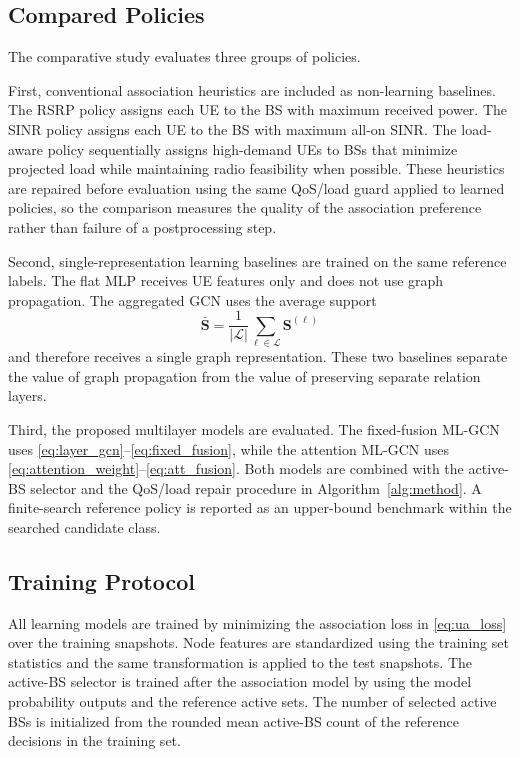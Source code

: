 \documentclass[journal]{IEEEtran}
\begin{document}
\subsection{Compared Policies}
The comparative study evaluates three groups of policies.

First, conventional association heuristics are included as non-learning
baselines. The RSRP policy assigns each UE to the BS with maximum received
power. The SINR policy assigns each UE to the BS with maximum all-on SINR. The
load-aware policy sequentially assigns high-demand UEs to BSs that minimize
projected load while maintaining radio feasibility when possible. These
heuristics are repaired before evaluation using the same QoS/load guard applied
to learned policies, so the comparison measures the quality of the association
preference rather than failure of a postprocessing step.

Second, single-representation learning baselines are trained on the same
reference labels. The flat MLP receives UE features only and does not use graph
propagation. The aggregated GCN uses the average support
\begin{equation}
    \bar{\mathbf{S}}=\frac{1}{|\mathcal{L}|}
    \sum_{\ell\in\mathcal{L}}\mathbf{S}^{(\ell)}
\end{equation}
and therefore receives a single graph representation. These two baselines
separate the value of graph propagation from the value of preserving separate
relation layers.

Third, the proposed multilayer models are evaluated. The fixed-fusion ML-GCN
uses \eqref{eq:layer_gcn}--\eqref{eq:fixed_fusion}, while the attention ML-GCN
uses \eqref{eq:attention_weight}--\eqref{eq:att_fusion}. Both models are
combined with the active-BS selector and the QoS/load repair procedure in
Algorithm~\ref{alg:method}. A finite-search reference policy is reported as an
upper-bound benchmark within the searched candidate class.

\subsection{Training Protocol}
All learning models are trained by minimizing the association loss in
\eqref{eq:ua_loss} over the training snapshots. Node features are standardized
using the training set statistics and the same transformation is applied to the
test snapshots. The active-BS selector is trained after the association model by
using the model probability outputs and the reference active sets. The number
of selected active BSs is initialized from the rounded mean active-BS count of
the reference decisions in the training set.
\end{document}
